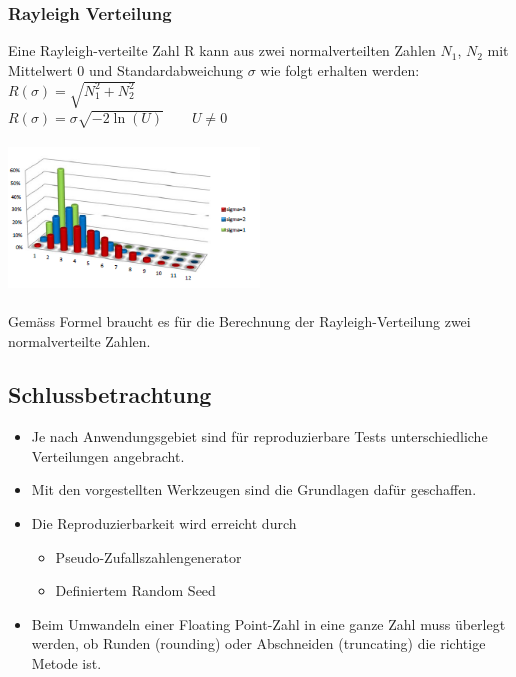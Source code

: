 \subsubsection{Rayleigh Verteilung}
Eine Rayleigh-verteilte Zahl R kann aus zwei normalverteilten Zahlen $N_1$, $N_2$ mit Mittelwert 0 und Standardabweichung $\sigma$ wie folgt erhalten werden:\\
$R(\sigma) = \sqrt{N_1^2 + N_2^2}$\\
$R(\sigma) = \sigma \sqrt{-2 \ln(U)} \qquad U \neq 0$\\\\
\includegraphics[width=0.5\textwidth]{images/Simulation/Rayleighverteilung.png}\\\\
Gemäss Formel braucht es für die Berechnung der Rayleigh-Verteilung zwei normalverteilte Zahlen.


\subsection{Schlussbetrachtung}
\begin{itemize}
	\item Je nach Anwendungsgebiet sind für reproduzierbare Tests unterschiedliche Verteilungen angebracht.
	\item Mit den vorgestellten Werkzeugen sind die Grundlagen dafür geschaffen.
	\item Die Reproduzierbarkeit wird erreicht durch
	\begin{itemize}
		\item Pseudo-Zufallszahlengenerator
		\item Definiertem Random Seed
	\end{itemize}
	\item Beim Umwandeln einer Floating Point-Zahl in eine ganze Zahl muss überlegt werden, ob Runden (rounding) oder Abschneiden (truncating) die richtige Metode ist.
\end{itemize}

